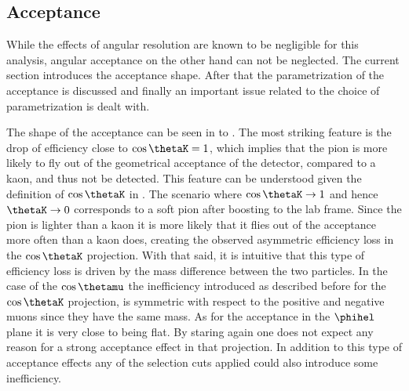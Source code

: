 \subsection{Acceptance}
\label{Accceptance}
While the effects of angular resolution are known to be negligible for this analysis, angular acceptance on the other hand can
not be neglected. The current section introduces the acceptance shape. After that the parametrization of the acceptance is discussed
and finally an important issue related to the choice of parametrization is dealt with.

The shape of the acceptance can be seen in  to . The most striking feature is the drop of efficiency
close to $\cos\thetaK=1$, which implies that the pion is more likely to fly out of the geometrical acceptance of the detector, compared to a kaon,
and thus not be detected. This feature can be understood given the  definition of $\cos\thetaK$ in .
The scenario where $\cos\thetaK\rightarrow 1$ and hence $\thetaK \rightarrow 0$ corresponds to a soft pion after boosting
to the lab frame. Since the pion is lighter than a kaon it is more likely that it flies out of the acceptance more
often than a kaon does, creating the observed asymmetric efficiency loss in the $\cos\thetaK$ projection. With that said, it is intuitive that
this type of efficiency loss is driven by the mass difference between the two particles. In the case of the $\cos\thetamu$ the
inefficiency introduced as described before for the $\cos\thetaK$ projection, is symmetric with respect to the positive and negative muons since
they have the same mass. As for the acceptance in the $\phihel$ plane it is very close to being flat. By staring again  one does not expect any
reason for a strong acceptance effect in that projection. In addition to this type of acceptance effects any of the selection
cuts applied could also introduce some inefficiency.

